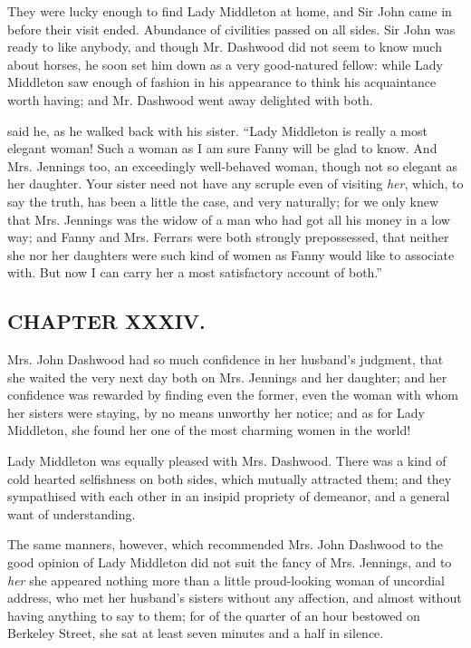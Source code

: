 They were lucky enough to find Lady Middleton at home, and Sir John came in before their visit ended. Abundance of civilities passed on all sides. Sir John was ready to like anybody, and though Mr. Dashwood did not seem to know much about horses, he soon set him down as a very good-natured fellow: while Lady Middleton saw enough of fashion in his appearance to think his acquaintance worth having; and Mr. Dashwood went away delighted with both.

 said he, as he walked back with his sister. “Lady Middleton is really a most elegant woman! Such a woman as I am sure Fanny will be glad to know. And Mrs. Jennings too, an exceedingly well-behaved woman, though not so elegant as her daughter. Your sister need not have any scruple even of visiting {\em her}, which, to say the truth, has been a little the case, and very naturally; for we only knew that Mrs. Jennings was the widow of a man who had got all his money in a low way; and Fanny and Mrs. Ferrars were both strongly prepossessed, that neither she nor her daughters were such kind of women as Fanny would like to associate with. But now I can carry her a most satisfactory account of both.”

\subsection[chapter-xxxiv.]{\useURL[url34][][][]\from[url34]CHAPTER XXXIV.}

Mrs. John Dashwood had so much confidence in her husband's judgment, that she waited the very next day both on Mrs. Jennings and her daughter; and her confidence was rewarded by finding even the former, even the woman with whom her sisters were staying, by no means unworthy her notice; and as for Lady Middleton, she found her one of the most charming women in the world!

Lady Middleton was equally pleased with Mrs. Dashwood. There was a kind of cold hearted selfishness on both sides, which mutually attracted them; and they sympathised with each other in an insipid propriety of demeanor, and a general want of understanding.

The same manners, however, which recommended Mrs. John Dashwood to the good opinion of Lady Middleton did not suit the fancy of Mrs. Jennings, and to {\em her} she appeared nothing more than a little proud-looking woman of uncordial address, who met her husband's sisters without any affection, and almost without having anything to say to them; for of the quarter of an hour bestowed on Berkeley Street, she sat at least seven minutes and a half in silence.

